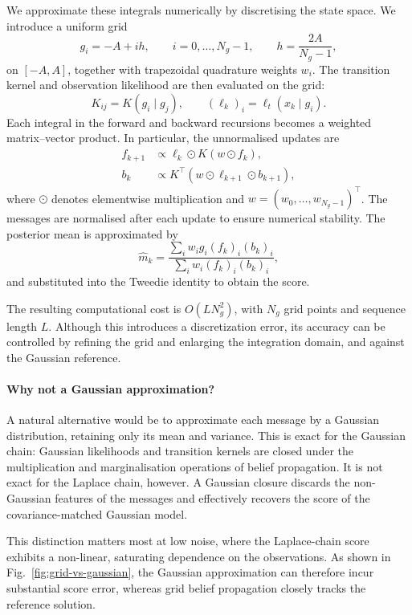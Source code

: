\documentclass{article}
\begin{document}
We approximate these integrals numerically by discretising the
state space. We introduce a uniform grid
\begin{equation}
    g_i=-A+ih,\qquad i=0,\ldots,N_g-1,
    \qquad h=\frac{2A}{N_g-1},
\end{equation}
on $[-A,A]$, together with trapezoidal quadrature weights
$w_i$. The transition kernel and observation likelihood are
then evaluated on the grid:
\begin{equation}
    K_{ij}=K(g_i\mid g_j),
    \qquad
    (\ell_k)_i=\ell_t(x_k\mid g_i).
\end{equation}
Each integral in the forward and backward recursions becomes
a weighted matrix--vector product. In particular, the
unnormalised updates are
\begin{align}
    f_{k+1}
    &\propto
    \ell_k\odot K(w\odot f_k),\\
    b_k
    &\propto
    K^\top(w\odot\ell_{k+1}\odot b_{k+1}),
\end{align}
where $\odot$ denotes elementwise multiplication and
$w=(w_0,\ldots,w_{N_g-1})^\top$.
The messages are normalised after each update to ensure
numerical stability. The posterior mean is approximated by
\begin{equation}
    \widehat m_k
    =
    \frac{\sum_i w_i g_i(f_k)_i(b_k)_i}
         {\sum_i w_i(f_k)_i(b_k)_i},
\end{equation}
and substituted into the Tweedie identity to obtain the score.

The resulting computational cost is
$O(LN_g^2)$, with $N_g$ grid points and sequence length $L$.
Although this introduces a discretization error, its
accuracy can be controlled by refining the grid and enlarging
the integration domain, and against the Gaussian reference.

\paragraph{Why not a Gaussian approximation?}
A natural alternative would be to approximate each message
by a Gaussian distribution, retaining only its mean and
variance. This is exact for the Gaussian chain: Gaussian
likelihoods and transition kernels are closed under the
multiplication and marginalisation operations of belief
propagation. It is not exact for the Laplace chain, however.
A Gaussian closure discards the non-Gaussian features of the
messages and effectively recovers the score of the
covariance-matched Gaussian model.

This distinction matters most at low noise, where the
Laplace-chain score exhibits a non-linear, saturating
dependence on the observations. As shown in
Fig.~\ref{fig:grid-vs-gaussian}, the Gaussian approximation
can therefore incur substantial score error, whereas grid
belief propagation closely tracks the reference solution.
\end{document}
